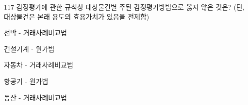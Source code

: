 \begin{question}{117}
감정평가에 관한 규칙상 대상물건별 주된 감정평가방법으로 옳지 않은 것은? (단, 대상물건은 본래 용도의 효용가치가 있음을 전제함)
\begin{choices}
  \item 선박 - 거래사례비교법
  \item 건설기계 - 원가법
  \item 자동차 - 거래사례비교법
  \item 항공기 - 원가법
  \item 동산 - 거래사례비교법
\end{choices}
\end{question}
